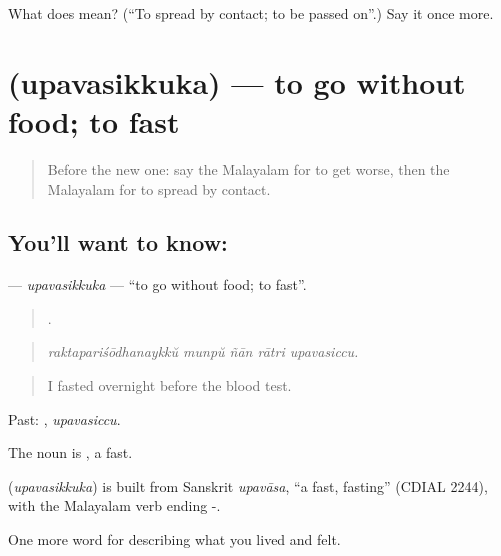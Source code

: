 \begin{tcolorbox}[breakable,colback=teal!4,colframe=teal!35!black,title={Before you move on}]
What does  mean? (\textquotedblleft{}To spread by contact; to be passed on\textquotedblright{}.) Say it once more.
\end{tcolorbox}
\section[\texorpdfstring{\ml{ഉപവസിക്കുക} (upavasikkuka)}{ഉപവസിക്കുക (upavasikkuka)}]{ (upavasikkuka) — to go without food; to fast}

\label{lesson:ML-C541-upavasikkuka}



\begin{quote}
Before the new one: say the Malayalam for to get worse, then the Malayalam for to spread by contact.
\end{quote}

\subsection*{You'll want to know: }
\textbf{} — \emph{upavasikkuka} — \textquotedblleft{}to go without food; to fast\textquotedblright{}.

\begin{quote}
    .
\end{quote}

\begin{quote}
\emph{raktapariśōdhanaykkŭ munpŭ ñān rātri upavasiccu.}
\end{quote}

\begin{quote}
I fasted overnight before the blood test.
\end{quote}

Past: , \emph{upavasiccu}.

The noun is , a fast.

\begin{cousinweb}
\textbf{} (\emph{upavasikkuka}) is built from Sanskrit \emph{upavāsa}, \textquotedblleft{}a fast, fasting\textquotedblright{} (CDIAL 2244), with the Malayalam verb ending -.
\end{cousinweb}

\begin{grammarlens}[title={What you've built}]
One more word for describing what you lived and felt.
\end{grammarlens}

